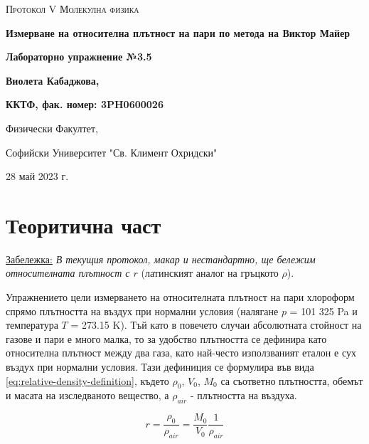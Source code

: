 \documentclass[12pt]{article}
\begin{document}
\begin{titlepage}
	\flushleft
	{\scshape\Large Протокол V \hspace{2cm} Молекулна физика\par}
	\vspace{4cm}
	{\huge\bfseries Измерване на относителна плътност на пари по метода на Виктор Майер\par}
	\vspace{1cm}
	{\LARGE\bfseries Лабораторно упражнение №3.5\par}
	\vspace{5cm}
    {\LARGE\bfseries Виолета Кабаджова, \par}
    {\large\bfseries ККТФ, фак. номер: 3PH0600026\par}
	\vspace{1cm}
	
	{\large Физически Факултет, 
	
	Софийски Университет "Св. Климент Охридски"
	
	28 май 2023 г.\par}
	
\end{titlepage}

\section{Теоритична част}\label{sec:theoretical-part}
\underline{Забележка:} \textit{В текущия протокол, макар и нестандартно, ще бележим относителната плътност с $r$} (латинският аналог на гръцкото $\rho$). 

Упражнението цели измерването на относителната плътност на пари хлороформ спрямо плътността на въздух при нормални условия (налягане $p$ = 101 325 Pa и температура $T$ = 273.15 K). Тъй като в повечето случаи абсолютната стойност на газове и пари е много малка, то за удобство плътността се дефинира като относителна плътност между два газа, като най-често използваният еталон е сух въздух при нормални условия. Тази дефиниция се формулира във вида \ref{eq:relative-density-definition}, където $\rho_0$, $V_0$, $M_0$ са съответно плътността, обемът и масата на изследваното вещество, а $\rho_{air}$ - плътността на въздуха.  

\begin{equation}\label{eq:relative-density-definition}
    r = \frac{\rho_0}{\rho_{air}} = \frac{M_0}{V_0} \frac{1}{\rho_{air}}
\end{equation}
\end{document}
